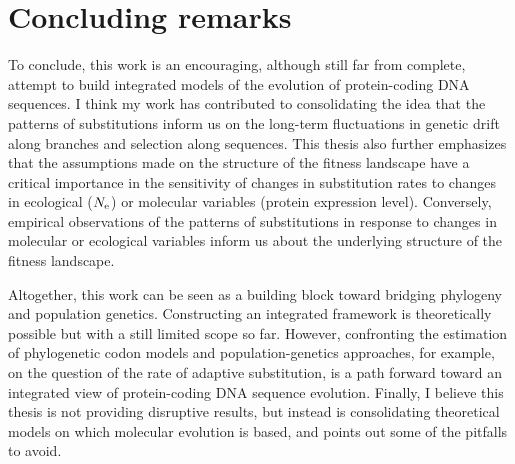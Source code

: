 \section{Concluding remarks}
\label{sec:concluding-remarks}

To conclude, this work is an encouraging, although still far from complete, attempt to build integrated models of the evolution of protein-coding \acrshort{DNA} sequences.
I think my work has contributed to consolidating the idea that the patterns of \glspl{substitution} inform us on the long-term fluctuations in \gls{genetic drift} along branches and selection along sequences.
This thesis also further emphasizes that the assumptions made on the structure of the fitness landscape have a critical importance in the sensitivity of changes in \gls{substitution} rates to changes in ecological ($N_{\text{e}}$) or molecular variables (protein expression level).
Conversely, empirical observations of the patterns of \glspl{substitution} in response to changes in molecular or ecological variables inform us about the underlying structure of the fitness landscape.

Altogether, this work can be seen as a building block toward bridging phylogeny and population genetics.
Constructing an integrated framework is theoretically possible but with a still limited scope so far.
However, confronting the estimation of phylogenetic \gls{codon} models and population-genetics approaches, for example, on the question of the rate of adaptive \gls{substitution}, is a path forward toward an integrated view of protein-coding \acrshort{DNA} sequence evolution.
Finally, I believe this thesis is not providing disruptive results, but instead is consolidating theoretical models on which molecular evolution is based, and points out some of the pitfalls to avoid.
